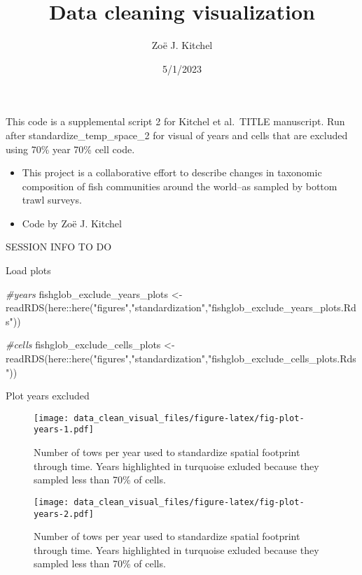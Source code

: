 \documentclass[
]{article}
\title{Data cleaning visualization}
\author{Zoë J. Kitchel}
\date{5/1/2023}
\newenvironment{Shaded}{\begin{snugshade}}{\end{snugshade}}
\newcommand{\CommentTok}[1]{\textcolor[rgb]{0.56,0.35,0.01}{\textit{#1}}}
\newcommand{\FunctionTok}[1]{\textcolor[rgb]{0.00,0.00,0.00}{#1}}
\newcommand{\NormalTok}[1]{#1}
\newcommand{\OtherTok}[1]{\textcolor[rgb]{0.56,0.35,0.01}{#1}}
\newcommand{\SpecialCharTok}[1]{\textcolor[rgb]{0.00,0.00,0.00}{#1}}
\newcommand{\StringTok}[1]{\textcolor[rgb]{0.31,0.60,0.02}{#1}}
\begin{document}
\maketitle

{
\setcounter{tocdepth}{2}
\tableofcontents
}
This code is a supplemental script 2 for Kitchel et al.~TITLE manuscript. Run after standardize\_temp\_space\_2 for visual of years and cells that are excluded using 70\% year 70\% cell code.

\begin{itemize}
\item
  This project is a collaborative effort to describe changes in taxonomic composition of fish communities around the world--as sampled by bottom trawl surveys.
\item
  Code by Zoë J. Kitchel
\end{itemize}

SESSION INFO TO DO

Load plots

\begin{Shaded}
\begin{Highlighting}[]
\CommentTok{\#years}
\NormalTok{fishglob\_exclude\_years\_plots }\OtherTok{\textless{}{-}} \FunctionTok{readRDS}\NormalTok{(here}\SpecialCharTok{::}\FunctionTok{here}\NormalTok{(}\StringTok{"figures"}\NormalTok{,}\StringTok{"standardization"}\NormalTok{,}\StringTok{"fishglob\_exclude\_years\_plots.Rds"}\NormalTok{))}

\CommentTok{\#cells}
\NormalTok{fishglob\_exclude\_cells\_plots }\OtherTok{\textless{}{-}} \FunctionTok{readRDS}\NormalTok{(here}\SpecialCharTok{::}\FunctionTok{here}\NormalTok{(}\StringTok{"figures"}\NormalTok{,}\StringTok{"standardization"}\NormalTok{,}\StringTok{"fishglob\_exclude\_cells\_plots.Rds"}\NormalTok{))}
\end{Highlighting}
\end{Shaded}

Plot years excluded

\begin{figure}
\centering
\texttt{[image: data\_clean\_visual\_files/figure-latex/fig-plot-years-1.pdf]}
\caption{\label{fig:fig-plot-years-1}Number of tows per year used to standardize spatial footprint through time. Years highlighted in turquoise exluded because they sampled less than 70\% of cells.}
\end{figure}

\begin{figure}
\centering
\texttt{[image: data\_clean\_visual\_files/figure-latex/fig-plot-years-2.pdf]}
\caption{\label{fig:fig-plot-years-2}Number of tows per year used to standardize spatial footprint through time. Years highlighted in turquoise exluded because they sampled less than 70\% of cells.}
\end{figure}
\end{document}

